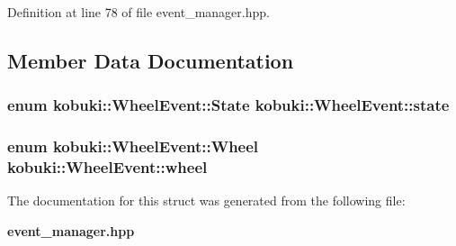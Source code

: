 \-Definition at line 78 of file event\-\_\-manager.\-hpp.



\subsection{\-Member \-Data \-Documentation}
\subsubsection[{state}]{\setlength{\rightskip}{0pt plus 5cm}enum {\bf kobuki\-::\-Wheel\-Event\-::\-State}  {\bf kobuki\-::\-Wheel\-Event\-::state}}\label{structkobuki_1_1WheelEvent_abc49fa25158af23f31bd0e8348fe2f4e}
\subsubsection[{wheel}]{\setlength{\rightskip}{0pt plus 5cm}enum {\bf kobuki\-::\-Wheel\-Event\-::\-Wheel}  {\bf kobuki\-::\-Wheel\-Event\-::wheel}}\label{structkobuki_1_1WheelEvent_a2c8867560bae32f5c74d2fa3da7acaae}


\-The documentation for this struct was generated from the following file\-:\begin{DoxyCompactItemize}
\item 
{\bf event\-\_\-manager.\-hpp}\end{DoxyCompactItemize}
